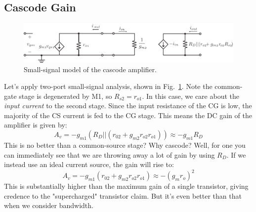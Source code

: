 \subsection{Cascode Gain}
\begin{figure}[tb]
\centering
\includegraphics[scale=0.95]{11cascode_ss}
\caption{Small-signal model of the cascode amplifier.}
\label{fig:11cascode_ss}
\end{figure}
Let's apply two-port small-signal analysis, shown in Fig.~\ref{fig:11cascode_ss}.  Note the common-gate stage is degenerated by M1, so $R_{s2} = r_{o1}$. In this case, we care about the \textit{input current }to the second stage. Since the input resistance of the CG is low, the majority of the CS current is fed to the CG stage.  This means the DC gain of the amplifier is given by:
    \begin{equation}
        A_v = -g_{m1} \left(R_D || (r_{02} + g_{m2}r_{o2} r_{o1}) \right) \approx -g_{m1} R_D
    \end{equation}
This is no better than a common-source stage?  Why cascode?  Well, for one you can immediately see that we are throwing away a lot of gain by using $R_D$.  If we instead use an ideal current source, the gain will rise to:
    \begin{equation}
        A_v = -g_{m1}  (r_{02} + g_{m2}r_{o2} r_{o1}) \approx - (g_m r_o)^2 
    \end{equation}
This is substantially higher than the maximum gain of a single transistor, giving credence to the "supercharged" transistor claim.  But it's even better than that when we consider bandwidth. 
